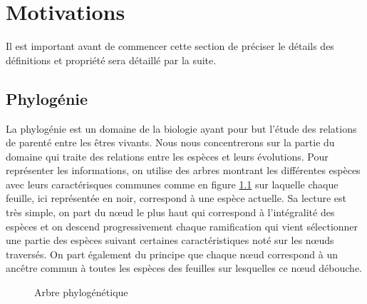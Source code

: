 \chapter{Motivations}

Il est important avant de commencer cette section de préciser le détails des définitions et propriété sera détaillé par la suite.

\section{Phylogénie}

La phylogénie est un domaine de la biologie ayant pour but l'étude des relations de parenté entre les êtres vivants. Nous nous concentrerons sur la partie du domaine qui traite des relations entre les espèces et leurs évolutions. Pour représenter les informations, on utilise des arbres montrant les différentes espèces avec leurs caractérisques communes comme en figure \ref{arbre_phylogenie} sur laquelle chaque feuille, ici représentée en noir, correspond à une espèce actuelle. Sa lecture est très simple, on part du n\oe ud le plus haut qui correspond à l'intégralité des espèces et on descend progressivement chaque ramification qui vient sélectionner une partie des espèces suivant certaines caractéristiques noté sur les n\oe uds traversés. On part également du principe que chaque n\oe ud correspond à un ancêtre commun à toutes les espèces des feuilles sur lesquelles ce n\oe ud débouche.

\begin{figure}[H]
	\begin{center}
	\end{center}
	\caption{Arbre phylogénétique}
	\label{arbre_phylogenie}
\end{figure}

